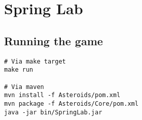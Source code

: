 \section{Spring Lab}

\subsection{Running the game}
\begin{verbatim}
# Via make target
make run

# Via maven
mvn install -f Asteroids/pom.xml
mvn package -f Asteroids/Core/pom.xml
java -jar bin/SpringLab.jar
\end{verbatim}
